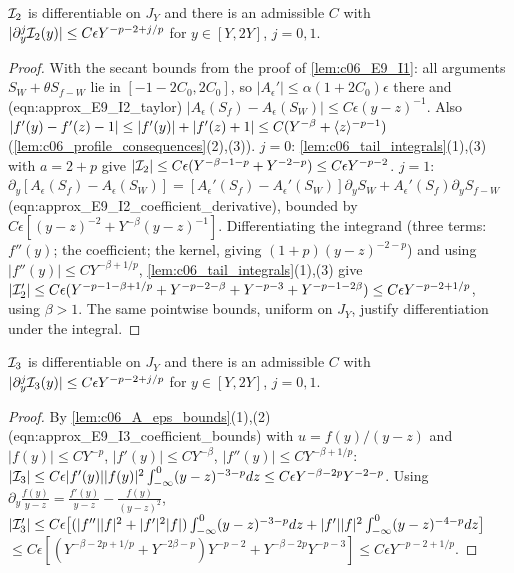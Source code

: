 \begin{lemma}
  \label{lem:c06_E9_I2}
  $\mathcal{I}_2$ is differentiable on $J_Y$ and there is an admissible $C$ with
  $|\partial^j_y\mathcal{I}_2(y)|\le C\epsilon Y^{-p-2+j/p}$ for $y\in[Y,2Y]$, $j=0,1$.
\end{lemma}
\begin{proof}
  With the secant bounds from the proof of \cref{lem:c06_E9_I1}: all arguments $S_W+\theta S_{f-W}$ lie in $[-1-2C_0,2C_0]$, so
  $|A_\epsilon'|\le\alpha(1+2C_0)\epsilon$ there and (eqn:approx\_E9\_I2\_taylor) $|A_\epsilon(S_f)-A_\epsilon(S_W)|\le C\epsilon(y-z)^{-1}$.
  Also $|f'(y)-f'(z)-1|\le|f'(y)|+|f'(z)+1|\le C(Y^{-\beta}+\langle z \rangle^{-p-1})$ (\cref{lem:c06_profile_consequences}(2),(3)).
  $j=0$: \cref{lem:c06_tail_integrals}(1),(3) with $a=2+p$ give $|\mathcal{I}_2|\le C\epsilon(Y^{-\beta-1-p}+Y^{-2-p})\le C\epsilon Y^{-p-2}$.
  $j=1$: $\partial_y[A_\epsilon(S_f)-A_\epsilon(S_W)]=[A_\epsilon'(S_f)-A_\epsilon'(S_W)]\partial_yS_W+A_\epsilon'(S_f)\partial_yS_{f-W}$
  (eqn:approx\_E9\_I2\_coefficient\_derivative), bounded by $C\epsilon[(y-z)^{-2}+Y^{-\beta}(y-z)^{-1}]$.
  Differentiating the integrand (three terms: $f''(y)$; the coefficient; the kernel, giving $(1+p)(y-z)^{-2-p}$) and using
  $|f''(y)|\le CY^{-\beta+1/p}$, \cref{lem:c06_tail_integrals}(1),(3) give
  $|\mathcal{I}_2'|\le C\epsilon(Y^{-p-1-\beta+1/p}+Y^{-p-2-\beta}+Y^{-p-3}+Y^{-p-1-2\beta})\le C\epsilon Y^{-p-2+1/p}$,
  using $\beta>1$. The same pointwise bounds, uniform on $J_Y$, justify differentiation under the integral.
\end{proof}

\begin{lemma}
  \label{lem:c06_E9_I3}
  $\mathcal{I}_3$ is differentiable on $J_Y$ and there is an admissible $C$ with
  $|\partial^j_y\mathcal{I}_3(y)|\le C\epsilon Y^{-p-2+j/p}$ for $y\in[Y,2Y]$, $j=0,1$.
\end{lemma}
\begin{proof}
  By \cref{lem:c06_A_eps_bounds}(1),(2) (eqn:approx\_E9\_I3\_coefficient\_bounds) with $u=f(y)/(y-z)$ and
  $|f(y)|\le CY^{-p}$, $|f'(y)|\le CY^{-\beta}$, $|f''(y)|\le CY^{-\beta+1/p}$:
  $|\mathcal{I}_3|\le C\epsilon|f'(y)||f(y)|^2\int_{-\infty}^0(y-z)^{-3-p}dz\le C\epsilon Y^{-\beta-2p}Y^{-2-p}$.
  Using $\partial_y\frac{f(y)}{y-z}=\frac{f'(y)}{y-z}-\frac{f(y)}{(y-z)^2}$,
  $|\mathcal{I}_3'|\le C\epsilon\bigl[(|f''||f|^2+|f'|^2|f|)\int_{-\infty}^0(y-z)^{-3-p}dz+|f'||f|^2\int_{-\infty}^0(y-z)^{-4-p}dz\bigr]$
  $\le C\epsilon[(Y^{-\beta-2p+1/p}+Y^{-2\beta-p})Y^{-p-2}+Y^{-\beta-2p}Y^{-p-3}]\le C\epsilon Y^{-p-2+1/p}$.
\end{proof}

